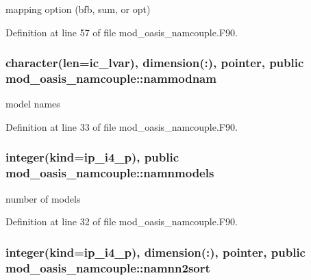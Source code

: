 mapping option (bfb, sum, or opt) 



Definition at line 57 of file mod\+\_\+oasis\+\_\+namcouple.\+F90.

\hypertarget{classmod__oasis__namcouple_a4b17296f706edcb9695f25babe240f23}{
\subsubsection[{nammodnam}]{\setlength{\rightskip}{0pt plus 5cm}character(len=ic\+\_\+lvar), dimension(\+:), pointer, public mod\+\_\+oasis\+\_\+namcouple\+::nammodnam}}\label{classmod__oasis__namcouple_a4b17296f706edcb9695f25babe240f23}


model names 



Definition at line 33 of file mod\+\_\+oasis\+\_\+namcouple.\+F90.

\hypertarget{classmod__oasis__namcouple_ab94a99d4801cf5a16beaa5ca3bb41046}{
\subsubsection[{namnmodels}]{\setlength{\rightskip}{0pt plus 5cm}integer(kind=ip\+\_\+i4\+\_\+p), public mod\+\_\+oasis\+\_\+namcouple\+::namnmodels}}\label{classmod__oasis__namcouple_ab94a99d4801cf5a16beaa5ca3bb41046}


number of models 



Definition at line 32 of file mod\+\_\+oasis\+\_\+namcouple.\+F90.

\hypertarget{classmod__oasis__namcouple_a0ace7c451d8658759b9c8d871926a76e}{
\subsubsection[{namnn2sort}]{\setlength{\rightskip}{0pt plus 5cm}integer(kind=ip\+\_\+i4\+\_\+p), dimension(\+:), pointer, public mod\+\_\+oasis\+\_\+namcouple\+::namnn2sort}}\label{classmod__oasis__namcouple_a0ace7c451d8658759b9c8d871926a76e}


